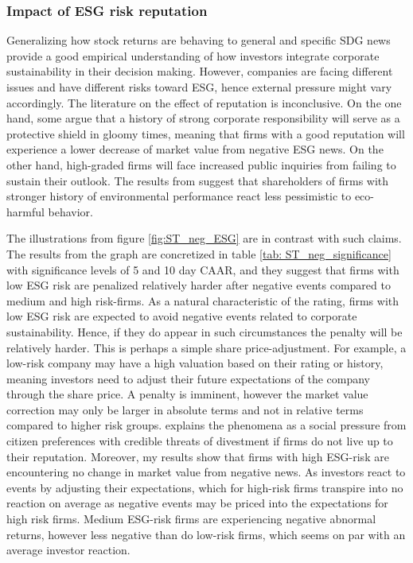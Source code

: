 \subsubsection{Impact of ESG risk reputation}

Generalizing how stock returns are behaving to general and specific SDG news provide a good empirical understanding of how investors integrate corporate sustainability in their decision making. However, companies are facing different issues and have different risks toward ESG, hence external pressure might vary accordingly. The literature on the effect of reputation is inconclusive. On the one hand, some argue that a history of strong corporate responsibility will serve as a protective shield in gloomy times, meaning that firms with a good reputation will experience a lower decrease of market value from negative ESG news. On the other hand, high-graded firms will face increased public inquiries from failing to sustain their outlook. The results from \cite{flammer2013corporate} suggest that shareholders of firms with stronger history of environmental performance react less pessimistic to eco-harmful behavior.

The illustrations from figure \ref{fig:ST_neg_ESG} are in contrast with such claims. The results from the graph are concretized in table \ref{tab: ST_neg_significance} with significance levels of 5 and 10 day CAAR, and they suggest that firms with low ESG risk are penalized relatively harder after negative events compared to medium and high risk-firms. As a natural characteristic of the rating, firms with low ESG risk are expected to avoid negative events related to corporate sustainability. Hence, if they do appear in such circumstances the penalty will be relatively harder. This is perhaps a simple share price-adjustment. For example, a low-risk company may have a high valuation based on their rating or history, meaning investors need to adjust their future expectations of the company through the share price. A penalty is imminent, however the market value correction may only be larger in absolute terms and not in relative terms compared to higher risk groups. \cite{baron2009positive} explains the phenomena as a social pressure from citizen preferences with credible threats of divestment if firms do not live up to their reputation. Moreover, my results show that firms with high ESG-risk are encountering no change in market value from negative news. As investors react to events by adjusting their expectations, which for high-risk firms transpire into no reaction on average as negative events may be priced into the expectations for high risk firms. Medium ESG-risk firms are experiencing negative abnormal returns, however less negative than do low-risk firms, which seems on par with an average investor reaction.   

